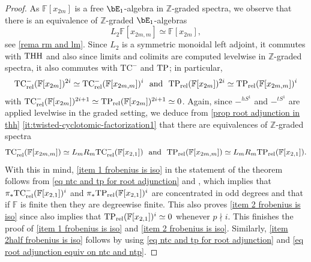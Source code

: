\documentclass[english,10pt]{amsart}
\newcommand{\rel}{\textup{rel}}
\newcommand{\field}{\mathbb{F}}
\theoremstyle{definition}
\numberwithin{equation}{section}
\newcommand{\ntc}{\mathrm{TC}^{-}}
\DeclareMathOperator{\tp}{\ensuremath{\textup{TP}}}
\DeclareMathOperator{\thh}{\ensuremath{\textup{THH}}}
\newcommand{\rntc}{\mathrm{TC}_{\rel}^{-}}
\newcommand{\rtp}{\mathrm{TP}_{\rel}}
\newcommand{\z}{\mathbb{Z}}
\newcommand{\pis}{\pi_*}
\begin{document}
\begin{proof}
As $\field[x_{2m}]$ is a free $\bE_1$-algebra in $\z$-graded spectra, we observe that there is an equivalence of $\z$-graded $\bE_1$-algebras 
\begin{equation}\label{eq grading shift to be compatible with bm}
L_2\field[x_{2m,m}] \simeq \field[x_{2m}],
\end{equation}
see \autoref{rema rm and lm}.
Since $L_2$ is a symmetric monoidal left adjoint, it commutes with $\thh$ and also since limits and colimits are computed levelwise in $\z$-graded spectra, it also commutes with $\ntc$ and $\tp$; in particular, 
\begin{equation}\label{eq ntc and tp for root adjunction}\rntc(\field[x_{2m}])^{2i} \simeq \rntc(\field[x_{2m,m}])^i \textup{\ \ and \ } \rtp(\field[x_{2m}])^{2i} \simeq \rtp(\field[x_{2m,m}])^i \end{equation}
with $\rntc(\field[x_{2m}])^{2i+1}\simeq \rtp(\field[x_{2m}])^{2i+1}\simeq 0$. Again, since $-^{hS^1}$ and $-^{tS^1}$ are applied levelwise in the graded setting, we deduce from \autoref{prop root adjunction in thh} \eqref{it:twisted-cyclotomic-factorization1} that there are equivalences of $\z$-graded spectra 
\begin{equation}\label{eq root adjunction equiv on ntc and ntp}
\rntc(\field[x_{2m,m}]) \simeq L_mR_m \rntc(\field[x_{2,1}])
\textup{\ \ and \ } \rtp(\field[x_{2m,m}]) \simeq L_mR_m \rtp(\field[x_{2,1}]).
\end{equation}
With this in mind, \eqref{item 1 frobenius is iso} in the statement of the theorem follows from \eqref{eq ntc and tp for root adjunction} and \cite[Proposition 6.3]{bayindir2020kthryofthh}, which implies that $\pis \rntc(\field[x_{2,1}])^i$ and $\pis \rtp(\field[x_{2,1}])^i$ are concentrated in odd degrees and that if  $\field$ is finite then they are degreewise finite. 
This also proves \eqref{item 2 frobenius is iso} since \cite[Proposition 6.3]{bayindir2020kthryofthh} also implies that $\rtp(\field[x_{2,1}])^i\simeq 0$ whenever $p\nmid i$. This finishes the proof of  \eqref{item 1 frobenius is iso} and \eqref{item 2 frobenius is iso}. Similarly, \eqref{item 2half frobenius is iso} follows by \cite[Proposition 6.3]{bayindir2020kthryofthh}  using  \eqref{eq ntc and tp for root adjunction} and \eqref{eq root adjunction equiv on ntc and ntp}.


\end{proof}
\end{document}
